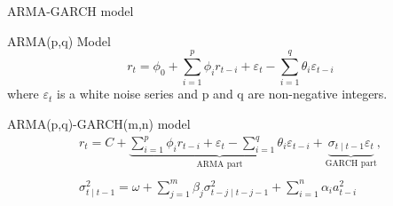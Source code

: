 \begin{frame}{ARMA-GARCH model}
  \begin{block}{ARMA(p,q) Model}
    \begin{displaymath}
      r_{t} =  \phi_{0}+\sum_{i=1}^{p} \phi_{i} r_{t-i}+\varepsilon_{t}-\sum_{i=1}^{q} \theta_{i} \varepsilon_{t-i}
    \end{displaymath}
    where ${\varepsilon_{t}}$ is a white noise series and p and q are non-negative integers.
  \end{block}

  \begin{block}{ARMA(p,q)-GARCH(m,n) model}
    \begin{displaymath}
      \begin{array}{c}
        r_{t} =  C +\underbrace{\sum_{i=1}^{p} \phi_{i} r_{t-i}+\varepsilon_{t}-\sum_{i=1}^{q} \theta_{i} \varepsilon_{t-i}}_{\textrm{ARMA part}} + \underbrace{\sigma_{t \mid t-1}\varepsilon_{t}}_{\textrm{GARCH part}},\\ 
          \\
        \sigma_{t \mid t-1}^2 = \omega + \sum_{j=1}^m{\beta_{j}\sigma_{t-j \mid t-j-1}^2} + \sum_{i=1}^n{\alpha_{i}a_{t-i}^2}
      \end{array}
    \end{displaymath}
  \end{block}
\end{frame}


